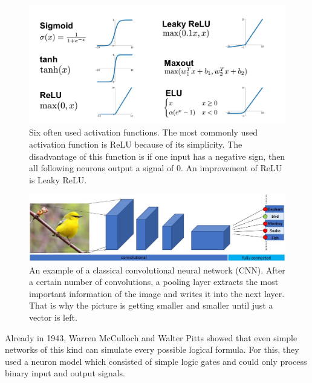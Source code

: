 \begin{figure}[H]
	\centering
	\includegraphics[width=1\linewidth]{Figures/chap1/ActivFunctions.png}
	\caption[Caption for LOF]{Six often used activation functions\footnotemark. The most commonly used activation function is ReLU because of its simplicity. The disadvantage of this function is if one input has a negative sign, then all following neurons output a signal of 0. An improvement of ReLU is Leaky ReLU.}
	\label{fig:chap1:ActivFunctions}
\end{figure}


\begin{figure}[H]
	\centering
	\includegraphics[width=1\linewidth]{Figures/chap1/classicalCNN.JPG}
	\caption{An example of a classical convolutional neural network (CNN). After a certain number of convolutions, a pooling layer extracts the most important information of the image and writes it into the next layer. That is why the picture is getting smaller and smaller until just a vector is left.}
	\label{fig:chap1:classicalCNN}
\end{figure}

Already in 1943, Warren McCulloch and Walter Pitts \cite{mcculloch} showed that even simple networks of this kind can simulate every possible logical formula. For this, they used a neuron model which consisted of simple logic gates and could only process binary input and output signals.

